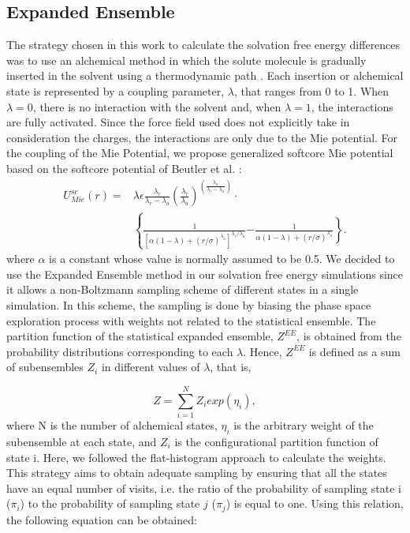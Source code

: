 \documentclass[final,12p,times,twocolumn]{elsarticle}
\begin{document}
	\subsection{Expanded Ensemble}
	
	The strategy chosen in this work to calculate the solvation free energy differences  was to use an alchemical method in which the solute molecule is gradually inserted in the solvent using a  thermodynamic path \cite{klimovich}. Each insertion or alchemical state is represented by a coupling parameter, $\lambda$, that ranges from 0 to 1. When $\lambda=0$, there is no interaction with the solvent and, when $\lambda=1$, the interactions are fully activated. Since the force field used does not explicitly take in consideration  the charges, the interactions are only due to the Mie potential. For the coupling of the Mie Potential, we propose generalized softcore Mie potential based on the softcore potential of Beutler et al.  \cite{beutler} :
	\begin{equation}
	\label{eq:miesoftcore}
	\begin{aligned}
	U_{Mie}^{sc}(r) {}=& \lambda\epsilon\frac{\lambda_r}{\lambda_r - \lambda_a} \left(\frac{\lambda_r}{\lambda_a} \right)^{\left( \frac{\lambda_a}{\lambda_r - \lambda_a} \right)} \cdot \\ 
	&  \left\lbrace\frac{1}{\left[\alpha(1-\lambda)+ (r/\sigma)^{\lambda_a}\right]^{\lambda_{r}/\lambda_{a}}}  \mathrm -  \right. \left. \frac{1}{\alpha(1-\lambda)+(r/\sigma)^{\lambda_a}}\right\rbrace .
	\end{aligned}
	\end{equation}
	where $\alpha$ is a constant whose value is  normally assumed to be 0.5. We decided to use the Expanded Ensemble method \cite{lyubartsev} in our solvation free energy simulations since it allows a non-Boltzmann sampling scheme of different states in a single simulation. In this scheme, the sampling is done by biasing the phase space exploration process with weights not related to the statistical ensemble. The partition function of the statistical expanded ensemble, $Z^{EE}$, is obtained from the probability distributions corresponding to each $\lambda$. Hence, $Z^{EE}$ is defined as a sum of subensembles $Z_{i}$ in different values of $\lambda$, that is,
	
	\begin{equation}
	Z = \sum_{i=1}^{N} Z_{i} exp(\eta_{i}),
	\label{ee}
	\end{equation}   
	where N is the number of alchemical states, $\eta_{i}$ is the arbitrary weight of the subensemble at each state, and $Z_{i}$ is the configurational partition function of state i. Here, we followed the flat-histogram approach \cite{bernd1992,bernd1993,dayal2004} to calculate the weights. This strategy aims to obtain adequate sampling by ensuring that all the states have an equal number of visits, i.e. the ratio of the probability of sampling state i ($\pi_{i}$) to the probability of sampling state $j$ ($\pi_{j}$) is equal to one. Using this relation, the following equation can be obtained:
	
\end{document}
